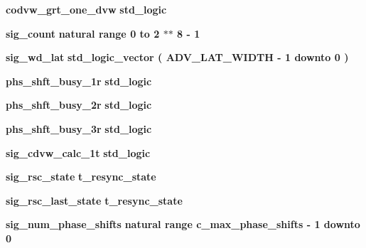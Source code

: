 \begin{DoxyCompactItemize}
{\bf codvw\+\_\+grt\+\_\+one\+\_\+dvw} {\bfseries \textcolor{comment}{std\+\_\+logic}\textcolor{vhdlchar}{ }} 
\item 
{\bf sig\+\_\+count} {\bfseries \textcolor{comment}{natural}\textcolor{vhdlchar}{ }\textcolor{vhdlchar}{ }\textcolor{vhdlchar}{ }\textcolor{keywordflow}{range}\textcolor{vhdlchar}{ }\textcolor{vhdlchar}{ } \textcolor{vhdldigit}{0} \textcolor{vhdlchar}{ }\textcolor{keywordflow}{to}\textcolor{vhdlchar}{ }\textcolor{vhdlchar}{ } \textcolor{vhdldigit}{2} \textcolor{vhdlchar}{$\ast$}\textcolor{vhdlchar}{$\ast$}\textcolor{vhdlchar}{ } \textcolor{vhdldigit}{8} \textcolor{vhdlchar}{-\/}\textcolor{vhdlchar}{ } \textcolor{vhdldigit}{1} \textcolor{vhdlchar}{ }} 
\item 
{\bf sig\+\_\+wd\+\_\+lat} {\bfseries \textcolor{comment}{std\+\_\+logic\+\_\+vector}\textcolor{vhdlchar}{ }\textcolor{vhdlchar}{(}\textcolor{vhdlchar}{ }\textcolor{vhdlchar}{ }\textcolor{vhdlchar}{ }\textcolor{vhdlchar}{ }{\bfseries {\bf A\+D\+V\+\_\+\+L\+A\+T\+\_\+\+W\+I\+D\+TH}} \textcolor{vhdlchar}{-\/}\textcolor{vhdlchar}{ } \textcolor{vhdldigit}{1} \textcolor{vhdlchar}{ }\textcolor{keywordflow}{downto}\textcolor{vhdlchar}{ }\textcolor{vhdlchar}{ } \textcolor{vhdldigit}{0} \textcolor{vhdlchar}{ }\textcolor{vhdlchar}{)}\textcolor{vhdlchar}{ }} 
\item 
{\bf phs\+\_\+shft\+\_\+busy\+\_\+1r} {\bfseries \textcolor{comment}{std\+\_\+logic}\textcolor{vhdlchar}{ }} 
\item 
{\bf phs\+\_\+shft\+\_\+busy\+\_\+2r} {\bfseries \textcolor{comment}{std\+\_\+logic}\textcolor{vhdlchar}{ }} 
\item 
{\bf phs\+\_\+shft\+\_\+busy\+\_\+3r} {\bfseries \textcolor{comment}{std\+\_\+logic}\textcolor{vhdlchar}{ }} 
\item 
{\bf sig\+\_\+cdvw\+\_\+calc\+\_\+1t} {\bfseries \textcolor{comment}{std\+\_\+logic}\textcolor{vhdlchar}{ }} 
\item 
{\bf sig\+\_\+rsc\+\_\+state} {\bfseries {\bfseries {\bf t\+\_\+resync\+\_\+state}} \textcolor{vhdlchar}{ }} 
\item 
{\bf sig\+\_\+rsc\+\_\+last\+\_\+state} {\bfseries {\bfseries {\bf t\+\_\+resync\+\_\+state}} \textcolor{vhdlchar}{ }} 
\item 
{\bf sig\+\_\+num\+\_\+phase\+\_\+shifts} {\bfseries \textcolor{comment}{natural}\textcolor{vhdlchar}{ }\textcolor{vhdlchar}{ }\textcolor{vhdlchar}{ }\textcolor{keywordflow}{range}\textcolor{vhdlchar}{ }\textcolor{vhdlchar}{ }\textcolor{vhdlchar}{ }\textcolor{vhdlchar}{ }{\bfseries {\bf c\+\_\+max\+\_\+phase\+\_\+shifts}} \textcolor{vhdlchar}{-\/}\textcolor{vhdlchar}{ } \textcolor{vhdldigit}{1} \textcolor{vhdlchar}{ }\textcolor{keywordflow}{downto}\textcolor{vhdlchar}{ }\textcolor{vhdlchar}{ } \textcolor{vhdldigit}{0} \textcolor{vhdlchar}{ }} 

\end{DoxyCompactItemize}
